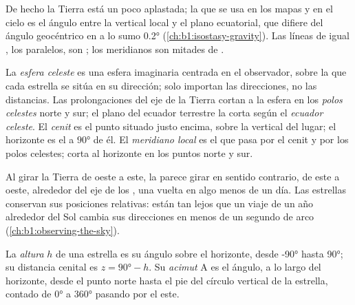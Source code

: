 De hecho la Tierra está un poco aplastada; la  que se usa en los mapas y
en el cielo es el ángulo entre la vertical local y el plano ecuatorial, que
difiere del ángulo geocéntrico en a lo sumo \ang{0.2}
(\cref{ch:b1:isostasy-gravity}). Las líneas de igual , los paralelos, son
; los meridianos son mitades de .

\begin{definition}\label{def:b1:spherical-astronomy:celestial-sphere}
La \emph{esfera celeste} es una esfera imaginaria centrada
en el observador, sobre la que cada estrella se sitúa en su dirección; solo
importan las direcciones, no las distancias. Las prolongaciones del eje de la
Tierra cortan a la esfera en los \emph{polos celestes} norte
y sur; el plano del ecuador terrestre la corta según el \emph{ecuador
celeste}. El \emph{cenit} es el punto situado
justo encima, sobre la vertical del lugar; el horizonte es el  a
$\ang{90}$ de él. El \emph{meridiano local} es el  que pasa por el cenit y por los polos celestes; corta al horizonte en los
puntos norte y sur.
\end{definition}

Al girar la Tierra de oeste a este, la  parece girar en sentido
contrario, de este a oeste, alrededor del eje de los , una vuelta
en algo menos de un día. Las estrellas conservan sus posiciones relativas: están
tan lejos que un viaje de un año alrededor del Sol cambia sus direcciones en
menos de un segundo de arco (\cref{ch:b1:observing-the-sky}).

\begin{definition}\label{def:b1:spherical-astronomy:horizontal}
La \emph{altura} $h$ de una estrella es su ángulo
sobre el horizonte, desde \ang{-90} hasta \ang{90}; su distancia cenital es
$z = \ang{90} - h$. Su \emph{acimut} $\mathrm{A}$ es el ángulo, a
lo largo del horizonte, desde el punto norte hasta el pie del círculo vertical
de la estrella, contado de \ang{0} a \ang{360} pasando por el este.
\end{definition}

